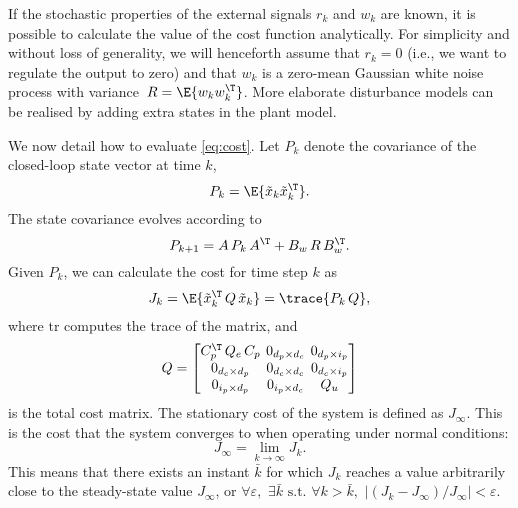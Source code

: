 If the stochastic properties of the external signals $r_k$ and $w_k$ are known, it is possible to calculate the value of the cost function analytically.
For simplicity and without loss of generality, we will henceforth assume that $r_k = 0$ (i.e., we want to regulate the output to zero) and that $w_k$ is a zero-mean Gaussian white noise process with variance~$R=\E{w_k w_k^\T}$.
More elaborate disturbance models can be realised by adding extra states in the plant model.

We now detail how to evaluate \eqref{eq:cost}.
Let $P_k$ denote the covariance of the closed-loop state vector at time $k$,
%
\begin{equation}
\label{eq:covarcalc}
    P_k = \E{\tilde x_k \tilde x_k^\T }.
\end{equation}
%
The state covariance evolves according to
%
\begin{equation}
\label{eq:covevolution}
    P_{k+1} = A \,P_k\, A^\T + B_w \,R\, B_w^\T.
\end{equation}
%
Given $P_k$, we can calculate the cost for time step $k$ as
%
\begin{equation}
\label{eq:covartocost}
    J_k = \E{\tilde x_k^\T \,Q\, \tilde x_k } = \trace{P_k \,Q},
\end{equation}
%
where $\mathrm{tr}$ computes the trace of the matrix, and
%
\begin{equation}
    \setlength\arraycolsep{2pt}
    Q = \begin{bmatrix} 
        C_p^\T\,Q_e\,C_p                           & 0_{\numstatesplant \times \numstatesctl} & 0_{\numstatesplant \times \numinputplant} \\
        0_{\numstatesctl \times \numstatesplant}  & 0_{\numstatesctl \times \numstatesctl}   & 0_{\numstatesctl \times \numinputplant} \\
        0_{\numinputplant \times \numstatesplant} & 0_{\numinputplant \times \numstatesctl}  & Q_u
    \end{bmatrix} 
\end{equation}
%
is the total cost matrix.
The stationary cost of the system is defined as $J_\infty$.
This is the cost that the system converges to when operating under normal conditions:
%
\begin{equation}
    J_\infty = \lim_{k\rightarrow\infty} J_k.
\end{equation}
%
This means that there exists an instant $\bar{k}$ for which $J_k$ reaches a value arbitrarily close to the steady-state value $J_\infty$, or $\forall \varepsilon, \,\, \exists \bar{k} \text{~s.t.~} \forall k>\bar{k},\,\,|(J_k - J_\infty)/J_\infty| < \varepsilon$.
